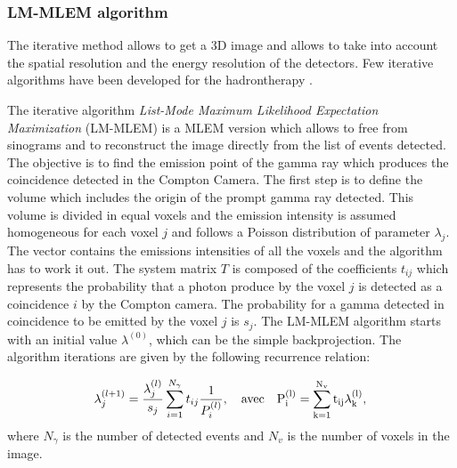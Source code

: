 \documentclass[12pt]{iopart}
\begin{document}
\subsubsection{LM-MLEM algorithm\newline}	

The iterative method allows to get a 3D image and allows to take into account the spatial resolution and the energy resolution of the detectors. Few iterative algorithms have been developed for the hadrontherapy  \cite{schone_common_2010, zoglauer_design_2011,gillam_compton_2011,mackin_evaluation_2012,lojacono_low_2013}.

The iterative algorithm  \textit{List-Mode Maximum Likelihood Expectation Maximization} (LM-MLEM) is a MLEM version which allows to free from sinograms and to reconstruct the image directly from the list of events detected. \newline
The objective is to find the emission point of the gamma ray which produces the coincidence detected in the Compton Camera. 
The first step is to define the volume which includes the origin of the prompt gamma ray detected. This volume is divided in equal voxels and the emission intensity is assumed homogeneous for each voxel $j$ and follows a Poisson distribution of parameter $\lambda_j$. The vector contains the emissions intensities of all the voxels and the algorithm has to work it out. The system matrix $T$ is composed of the coefficients  $t_{ij}$ which represents the probability that a photon produce by the voxel $j$ is detected as a coincidence $i$ by the Compton camera. The probability for a gamma detected in coincidence to be emitted by the voxel $j$ is $s_j$.
The LM-MLEM algorithm starts with an initial value $\lambda^{(0)}$, which can be the simple backprojection.
The algorithm iterations are given by the following recurrence relation:

\begin{equation}
\lambda_j^{(l+1)} =  \frac{\lambda_j^{(l)} }{s_j} \sum\limits_{i=1}^{N_{\gamma}} t_{ij} \frac{1}{P_i^{(l)}},\quad \rm{avec}\quad  P_i^{(l)}=\sum\limits_{k=1}^{N_{v}} t_{ij}\lambda_k^{(l)},
 \label{eq:equation_lambda_compton_med_nucleaire}\newline
\end{equation}
where $N_{\gamma}$ is the number of detected events and $N_v$ is the number of voxels in the image.\newline
\end{document}
